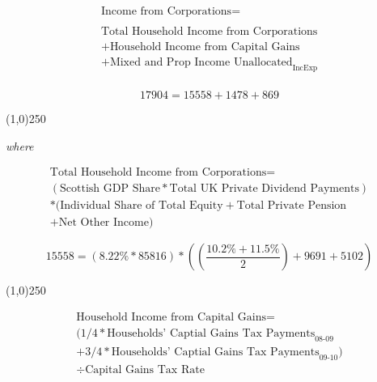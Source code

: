 \begin{enumerate}
\begin{equation}
\begin{split}
\text{Income from Corporations} =  \\ \\
\text{Total Household Income from Corporations}\\
+\text{Household Income from Capital Gains}\\
+\text{Mixed and Prop Income Unallocated}_\text{IncExp}\\
\end{split} \label{eq:2.5.4}
\end{equation}

\begin{equation} \nonumber
17904 = 15558+1478+869
\end{equation}

\begin{center}
\line(1,0){250}
\end{center}

\textit{where}

\begin{equation} 
\begin{split}
\text{Total Household Income from Corporations} = \\ 
(\text{Scottish GDP Share}*\text{Total UK Private Dividend Payments})\\
*(\text{Individual Share of Total Equity} + \text{Total Private Pension}\\
 + \text{Net Other Income})
\end{split} \label{eq:2.5.5}
\end{equation} 

\begin{equation} \nonumber
15558 = (8.22\% * 85816)*((\frac{10.2\%+11.5\%}{2})+9691+5102)
\end{equation}

\begin{center}
\line(1,0){250}
\end{center}


\begin{equation} 
\begin{split}
\text{Household Income from Capital Gains} = \\ 
(1/4 *\text{Households' Captial Gains Tax Payments}_\text{08-09}\\
+ 3/4 *\text{Households' Captial Gains Tax Payments}_\text{09-10})\\
\div \text{Capital Gains Tax Rate}
\end{split} \label{eq:2.5.6}
\end{equation} 


\end{enumerate}
